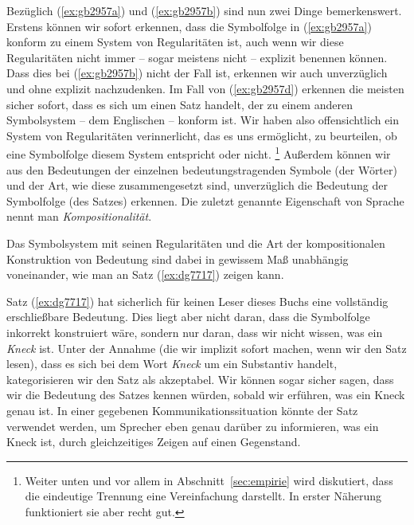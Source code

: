 \begin{exe}
  \ex
  \begin{xlist}
  \end{xlist}
\end{exe}


Bezüglich (\ref{ex:gb2957a}) und (\ref{ex:gb2957b}) sind nun zwei Dinge bemerkenswert.
Erstens können wir sofort erkennen, dass die Symbolfolge in (\ref{ex:gb2957a}) konform zu einem System von Regularitäten ist, auch wenn wir diese Regularitäten nicht immer -- sogar meistens nicht -- explizit benennen können.
Dass dies bei (\ref{ex:gb2957b}) nicht der Fall ist, erkennen wir auch unverzüglich und ohne explizit nachzudenken.
Im Fall von (\ref{ex:gb2957d}) erkennen die meisten sicher sofort, dass es sich um einen Satz handelt, der zu einem anderen Symbolsystem -- dem Englischen -- konform ist.
Wir haben also offensichtlich ein System von Regularitäten verinnerlicht, das es uns ermöglicht, zu beurteilen, ob eine Symbolfolge diesem System entspricht oder nicht.%
\footnote{Weiter unten und vor allem in Abschnitt~\ref{sec:empirie} wird diskutiert, dass die eindeutige Trennung eine Vereinfachung darstellt.
In erster Näherung funktioniert sie aber recht gut.}
Außerdem können wir aus den Bedeutungen der einzelnen bedeutungstragenden Symbole (der Wörter) und der Art, wie diese zusammengesetzt sind, unverzüglich die Bedeutung der Symbolfolge (des Satzes) erkennen.
Die zuletzt genannte Eigenschaft von Sprache nennt man \textit{Kompositionalität}.


Das Symbolsystem mit seinen Regularitäten und die Art der kompositionalen Konstruktion von Bedeutung sind dabei in gewissem Maß unabhängig voneinander, wie man an Satz (\ref{ex:dg7717}) zeigen kann.

\begin{exe}
\end{exe}

Satz (\ref{ex:dg7717}) hat sicherlich für keinen Leser dieses Buchs eine vollständig er\-schließ\-bare Bedeutung.
Dies liegt aber nicht daran, dass die Symbolfolge inkorrekt konstruiert wäre, sondern nur daran, dass wir nicht wissen, was ein \textit{Kneck} ist.
Unter der Annahme (die wir implizit sofort machen, wenn wir den Satz lesen), dass es sich bei dem Wort \textit{Kneck} um ein Substantiv handelt, kategorisieren wir den Satz als akzeptabel.
Wir können sogar sicher sagen, dass wir die Bedeutung des Satzes kennen würden, sobald wir erführen, was ein Kneck genau ist.
In einer gegebenen Kommunikationssituation könnte der Satz verwendet werden, um Sprecher eben genau darüber zu informieren, was ein Kneck ist, \zB durch gleichzeitiges Zeigen auf einen Gegenstand.

